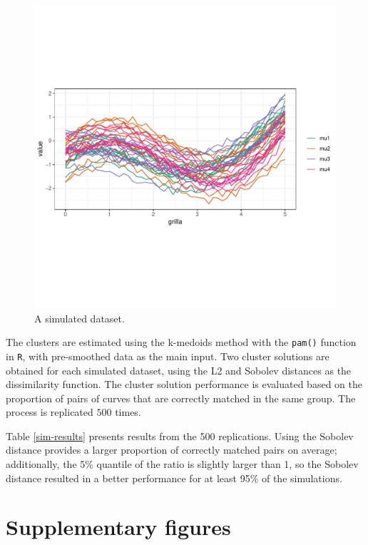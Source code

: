 \documentclass[smallextended,natbib]{svjour3}\usepackage[]{graphicx}\usepackage[]{xcolor}
\newcommand{\1}[1]{\mathbbm{1}_{#1}}
\begin{document}
\begin{figure}[hbpt]
\centering
\includegraphics[trim=0cm 4cm 0cm 3cm, clip, scale=.6]{figures/fig-simstudy2.pdf}
\caption{ A simulated dataset. \label{dataset} }
\end{figure} 

The clusters are estimated using the k-medoids method with the \texttt{pam()} function in \texttt{R}, with pre-smoothed data as the main input. Two cluster solutions are obtained for each simulated dataset, 
using the L2 and Sobolev distances as the dissimilarity function. The cluster solution performance is evaluated based on the proportion of pairs of curves that are correctly matched in the same group. The process is replicated $500$ times. 

Table \ref{sim-results} presents results from the 500 replications. Using the Sobolev distance provides a larger proportion of correctly matched pairs on average; additionally, the 5\% quantile of the ratio is slightly larger than 1, so the Sobolev distance resulted in a better performance for at least 95\% of the simulations. 



\section{Supplementary figures}
\label{app:figsup}
\end{document}
